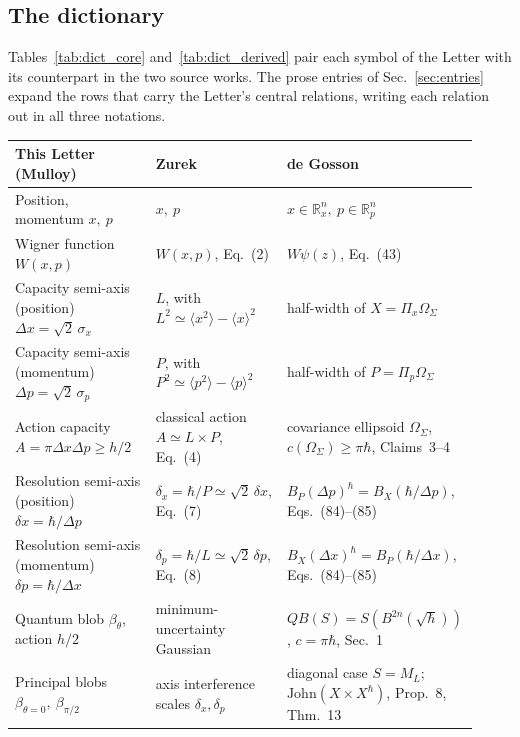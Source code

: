 \documentclass[%
  aps, amsmath, amssymb, onecolumn, 11pt
]{revtex4-2}
\begin{document}
\subsection{The dictionary}
\label{sec:table}

Tables~\ref{tab:dict_core} and~\ref{tab:dict_derived} pair each symbol of
the Letter with its counterpart in the two source works. The prose entries
of Sec.~\ref{sec:entries} expand the rows that carry the Letter's central
relations, writing each relation out in all three notations.

\begin{table}[ht]
\centering
\raggedright
\renewcommand{\arraystretch}{1.35}
\begin{tabular}{@{}p{0.30\linewidth} p{0.28\linewidth} p{0.34\linewidth}@{}}
\toprule
\textbf{This Letter (Mulloy)} & \textbf{Zurek \cite{zurek2001}} & \textbf{de Gosson \cite{degosson2024reconstruction, degosson2022polar, degosson2013qblobs}} \\
\midrule
Position, momentum $x,\ p$ & $x,\ p$ & $x\in\mathbb{R}^n_x,\ p\in\mathbb{R}^n_p$ \\
Wigner function $W(x,p)$ & $W(x,p)$, Eq.~(2) & $W\psi(z)$, Eq.~(43) \\
Capacity semi-axis (position) $\Delta x=\sqrt{2}\,\sigma_x$ & $L$, with $L^2\simeq\langle x^2\rangle-\langle x\rangle^2$ & half-width of $X=\Pi_x\Omega_\Sigma$ \\
Capacity semi-axis (momentum) $\Delta p=\sqrt{2}\,\sigma_p$ & $P$, with $P^2\simeq\langle p^2\rangle-\langle p\rangle^2$ & half-width of $P=\Pi_p\Omega_\Sigma$ \\
Action capacity $A=\pi\Delta x\Delta p\ge h/2$ & classical action $A\simeq L\times P$, Eq.~(4) & covariance ellipsoid $\Omega_\Sigma$, $c(\Omega_\Sigma)\ge\pi\hbar$, Claims~3--4 \\
Resolution semi-axis (position) $\delta x=\hbar/\Delta p$ & $\delta_x=\hbar/P\simeq\sqrt{2}\,\delta x$, Eq.~(7) & $B_P(\Delta p)^\hbar=B_X(\hbar/\Delta p)$, Eqs.~(84)--(85) \\
Resolution semi-axis (momentum) $\delta p=\hbar/\Delta x$ & $\delta_p=\hbar/L\simeq\sqrt{2}\,\delta p$, Eq.~(8) & $B_X(\Delta x)^\hbar=B_P(\hbar/\Delta x)$, Eqs.~(84)--(85) \\
Quantum blob $\beta_\theta$, action $h/2$ & minimum-uncertainty Gaussian & $QB(S)=S\!\left(B^{2n}(\sqrt{\hbar})\right)$, $c=\pi\hbar$, Sec.~1 \\
Principal blobs $\beta_{\theta=0},\ \beta_{\pi/2}$ & axis interference scales $\delta_x,\delta_p$ & diagonal case $S=M_L$; $\mathrm{John}(X\times X^\hbar)$, Prop.~8, Thm.~13 \\

\end{tabular}
\end{table}
\end{document}
